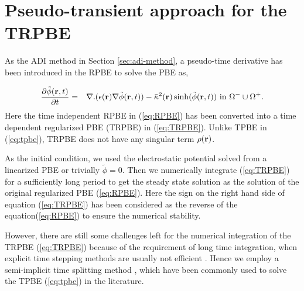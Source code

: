 \section{Pseudo-transient approach for the TRPBE}

As the ADI method in Section \ref{sec:adi-method}, a pseudo-time derivative has been introduced in the RPBE to solve the PBE as,  

\begin{eqnarray}
	 	\frac{\partial \tilde\phi(\textbf{r},t)}{\partial t} &=& \nabla.(\epsilon({\bf r}) \nabla \tilde\phi(\textbf{r},t))-\bar\kappa^2({\bf r}) \sinh(\tilde\phi(\textbf{r},t)) \text{ in } \Omega^- \cup \Omega^+ \label{eq:TRPBE}. %
\end{eqnarray}
Here the time independent RPBE in (\ref{eq:RPBE}) has been converted into a time dependent regularized PBE (TRPBE) in (\ref{eq:TRPBE}). Unlike TPBE in (\ref{eq:tpbe}), TRPBE does not have any singular term $\rho({\bf r})$.   

As the initial condition, we used the electrostatic potential solved from a linearized PBE \cite{Zhao2011} or trivially $\tilde \phi= 0$. Then we numerically integrate (\ref{eq:TRPBE}) for a sufficiently long period to get the steady state solution as the solution of the original regularized PBE (\ref{eq:RPBE}). Here the sign on the right hand side of equation (\ref{eq:TRPBE}) has been considered as the reverse of the equation(\ref{eq:RPBE}) to ensure the numerical stability. 

However, there are still some challenges left for the numerical integration of the TRPBE (\ref{eq:TRPBE}) because of the requirement of long time integration, when explicit time stepping methods are usually not efficient \cite{Sayyed-Ahmad2004,Shestakov2002,Zhao2011,zhao_operator_2014}. Hence we employ a semi-implicit time splitting method \cite{Sayyed-Ahmad2004,Shestakov2002}, which have been commonly used to solve the TPBE (\ref{eq:tpbe}) in the literature. 

